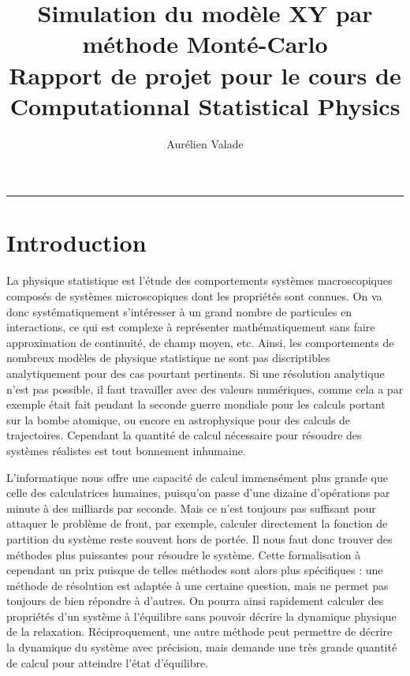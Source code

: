 \documentclass[a4paper, 11pt]{article}
\title{Simulation du modèle XY par méthode Monté-Carlo \medskip \\ 
       \Large Rapport de projet pour le cours de Computationnal Statistical Physics }
\author{Aurélien Valade}
\date{}
\begin{document}
\maketitle

{\centering \rule{\textwidth}{.5pt} }

\section*{Introduction}

La physique statistique est l'étude des comportements systèmes macroscopiques composés de systèmes
microscopiques dont les propriétés sont connues. On va donc systématiquement s'intéresser à un grand
nombre de particules en interactions, ce qui est complexe à représenter mathématiquement sans faire
approximation de continuité, de champ moyen, etc. Ainsi, les comportements de nombreux modèles de
physique statistique ne sont pas discriptibles analytiquement pour des cas pourtant pertinents.  Si
une résolution analytique n'est pas possible, il faut travailler avec des valeurs numériques, comme
cela a par exemple était fait pendant la seconde guerre mondiale pour les calculs portant sur la
bombe atomique, ou encore en astrophysique pour des calculs de trajectoires.  Cependant la quantité
de calcul nécessaire pour résoudre des systèmes réalistes est tout bonnement inhumaine.

L'informatique nous offre une capacité de calcul immensément plus grande que celle des calculatrices
humaines, puisqu'on passe d'une dizaine d'opérations par minute à des milliards par seconde. Mais ce
n'est toujours pas suffisant pour attaquer le problème de front, par exemple, calculer directement
la fonction de partition du système reste souvent hors de portée. Il nous faut donc trouver des
méthodes plus puissantes pour résoudre le système. Cette formalisation à cependant un prix puisque
de telles méthodes sont alors plus spécifiques : une méthode de résolution est adaptée à une
certaine question, mais ne permet pas toujours de bien répondre à d'autres. On pourra ainsi
rapidement calculer des propriétés d'un système à l'équilibre sans pouvoir décrire la dynamique
physique de la relaxation. Réciproquement, une autre méthode peut permettre de décrire la dynamique
du système avec précision, mais demande une très grande quantité de calcul pour atteindre l'état
d'équilibre. 
\end{document}
